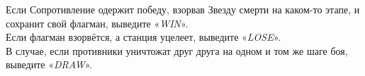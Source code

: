 \begin{problem}
\OutputFile

Если Сопротивление одержит победу, взорвав Звезду смерти на каком-то этапе, и сохранит свой флагман, выведите «\textit{WIN}».\\

Если флагман взорвётся, а станция уцелеет, выведите «\textit{LOSE}».\\

В случае, если противники уничтожат друг друга на одном и том же шаге боя, выведите «\textit{DRAW}».

\Examples

\begin{example}
%
%
%
\end{example}
\end{problem}
